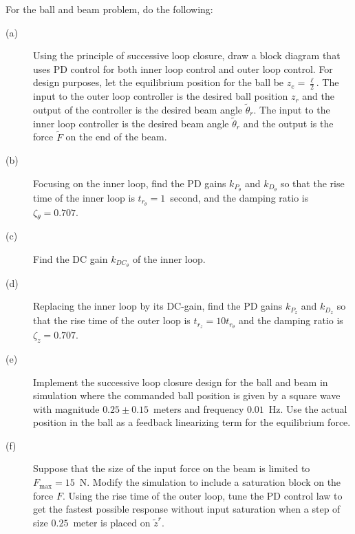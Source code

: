 For the ball and beam problem, do the following:
\begin{description}
\item[(a)] Using the principle of successive loop closure, draw a block diagram that uses PD control for both inner loop control and outer loop control. For design purposes, let the equilibrium position for the ball be $z_e=\frac{\ell}{2}$.  The input to the outer loop controller is the desired ball position $z_r$ and the output of the controller is the desired beam angle $\tilde{\theta}_r$.  The input to the inner loop controller is the desired beam angle $\tilde{\theta}_r$ and the output is the force $\tilde{F}$ on the end of the beam.
\item[(b)] Focusing on the inner loop, find the PD gains $k_{P_\theta}$ and $k_{D_\theta}$ so that the rise time of the inner loop is $t_{r_\theta}=1$~second, and the damping ratio is $\zeta_{\theta}=0.707$.
\item[(c)] Find the DC gain $k_{DC_\theta}$ of the inner loop.
\item[(d)] Replacing the inner loop by its DC-gain, find the PD gains $k_{P_z}$ and $k_{D_z}$ so that the rise time of the outer loop is $t_{r_z}=10 t_{r_\theta}$ and the damping ratio is $\zeta_z=0.707$.
\item[(e)] Implement the successive loop closure design for the ball and beam in simulation where the commanded ball position is given by a square wave with magnitude $0.25\pm 0.15$~meters and frequency $0.01$~Hz.  Use the actual position in the ball as a feedback linearizing term for the equilibrium force.  
\item[(f)] Suppose that the size of the input force on the beam is limited to $F_{\max}=15$~N.  Modify the simulation to include a saturation block on the force $F$.  Using the rise time of the outer loop, tune the PD control law to get the fastest possible response without input saturation when a step of size $0.25$~meter is placed on $\tilde{z}^r$. 
\end{description}

